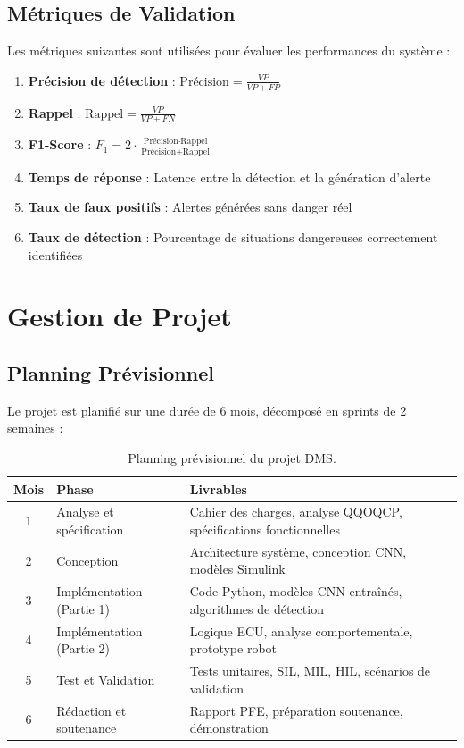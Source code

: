 \subsection{Métriques de Validation}

Les métriques suivantes sont utilisées pour évaluer les performances du système :

\begin{enumerate}[leftmargin=2cm]
    \item \textbf{Précision de détection} : $\text{Précision} = \frac{VP}{VP + FP}$
    \item \textbf{Rappel} : $\text{Rappel} = \frac{VP}{VP + FN}$
    \item \textbf{F1-Score} : $F_1 = 2 \cdot \frac{\text{Précision} \cdot \text{Rappel}}{\text{Précision} + \text{Rappel}}$
    \item \textbf{Temps de réponse} : Latence entre la détection et la génération d'alerte
    \item \textbf{Taux de faux positifs} : Alertes générées sans danger réel
    \item \textbf{Taux de détection} : Pourcentage de situations dangereuses correctement identifiées
\end{enumerate}

\section{Gestion de Projet}

\subsection{Planning Prévisionnel}

Le projet est planifié sur une durée de 6 mois, décomposé en sprints de 2 semaines :

\begin{table}[H]
\centering
\caption{Planning prévisionnel du projet DMS.}
\label{tab:planning}
\renewcommand{\arraystretch}{1.3}
\begin{tabularx}{\textwidth}{|c|l|X|}
\hline
\rowcolor{stellantisblue!15}
\textbf{Mois} & \textbf{Phase} & \textbf{Livrables} \\
\hline
1 & Analyse et spécification & Cahier des charges, analyse QQOQCP, spécifications fonctionnelles \\
\hline
2 & Conception & Architecture système, conception CNN, modèles Simulink \\
\hline
3 & Implémentation (Partie 1) & Code Python, modèles CNN entraînés, algorithmes de détection \\
\hline
4 & Implémentation (Partie 2) & Logique ECU, analyse comportementale, prototype robot \\
\hline
5 & Test et Validation & Tests unitaires, SIL, MIL, HIL, scénarios de validation \\
\hline
6 & Rédaction et soutenance & Rapport PFE, préparation soutenance, démonstration \\
\hline
\end{tabularx}
\end{table}


